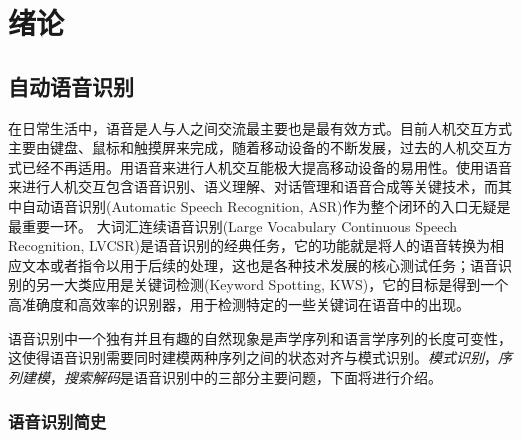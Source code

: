
\chapter{绪论}
\label{chap:intro0}

\section{自动语音识别}
\label{chap:intro0-asr}


在日常生活中，语音是人与人之间交流最主要也是最有效方式。目前人机交互方式主要由键盘、鼠标和触摸屏来完成，随着移动设备的不断发展，过去的人机交互方式已经不再适用。用语音来进行人机交互能极大提高移动设备的易用性。使用语音来进行人机交互包含语音识别、语义理解、对话管理和语音合成等关键技术，而其中自动语音识别(Automatic Speech Recognition, ASR)作为整个闭环的入口无疑是最重要一环。
大词汇连续语音识别(Large Vocabulary Continuous Speech Recognition, LVCSR)是语音识别的经典任务，它的功能就是将人的语音转换为相应文本或者指令以用于后续的处理，这也是各种技术发展的核心测试任务；语音识别的另一大类应用是关键词检测(Keyword Spotting, KWS)，它的目标是得到一个高准确度和高效率的识别器，用于检测特定的一些关键词在语音中的出现。

语音识别中一个独有并且有趣的自然现象是声学序列和语言学序列的长度可变性，这使得语音识别需要同时建模两种序列之间的状态对齐与模式识别。{\em 模式识别}，{\em 序列建模}，{\em 搜索解码}是语音识别中的三部分主要问题，下面将进行介绍。

\subsection{语音识别简史}
\label{chap:intro0-asr-history}

